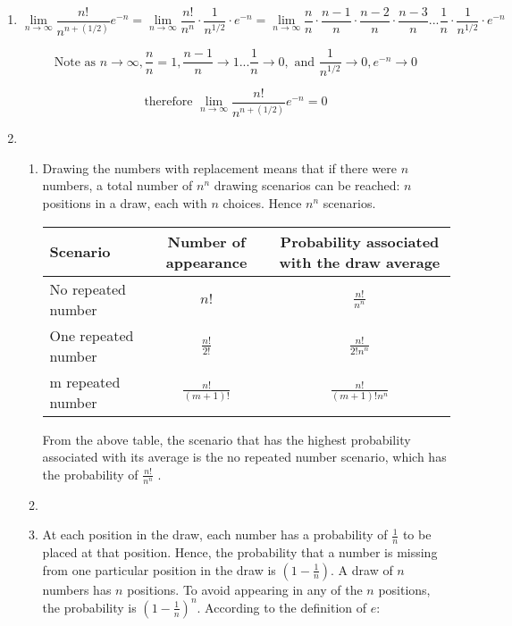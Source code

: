 \documentclass[11pt,letterpaper,titlepage]{article}
\begin{document}
\begin{enumerate}
    \item $$ \lim_{n\to\infty} \frac{n!}{n^{n+(1/2)}}e^{-n} = \lim_{n\to\infty} \frac{n!}{n^{n}} \cdot \frac{1}{n^{1/2}} \cdot e^{-n} = \lim_{n\to\infty} \frac{n}{n} \cdot \frac{n-1}{n} \cdot \frac{n-2}{n} \cdot \frac{n-3}{n} ... \frac{1}{n} \cdot \frac{1}{n^{1/2}} \cdot e^{-n} $$

    $$ \text{Note as } {n\to\infty}, \frac{n}{n} = 1, \frac{n-1}{n}\to 1...\frac{1}{n}\to 0, \text{ and } \frac{1}{n^{1/2}} \to 0, e^{-n} \to 0 $$
    
    $$ \text{therefore } \lim_{n\to\infty} \frac{n!}{n^{n+(1/2)}}e^{-n} = 0 $$
    
    \item \begin{enumerate}
        \item Drawing the numbers with replacement means that if there were $ n $ numbers, a total number of $ n^n $ drawing scenarios can be reached: $ n $ positions in a draw, each with $ n $ choices. Hence $ n^n $ scenarios.
        
        \begin{table}[ht]
        \centering
        \begin{tabular}{@{}lcc@{}}
        \toprule
        Scenario & Number of appearance & Probability associated with the draw average \\ \midrule
        No repeated number         &    $ n! $                   &   $ \frac{n!}{n^n} $                                           \\ \midrule
        One repeated number         &      $ \frac{n!}{2!} $                 &              $ \frac{n!}{2!n^n} $                                \\ \midrule
        m repeated number         &     $ \frac{n!}{(m+1)!} $                 &           $ \frac{n!}{(m+1)!n^n} $                                       \\ \bottomrule
        \end{tabular}
        \end{table}
        
        From the above table, the scenario that has the highest probability associated with its average is the no repeated number scenario, which has the probability of $ \frac{n!}{n^n} $ .
        
        \item
        
        \item At each position in the draw, each number has a probability of $ 
        \frac{1}{n} $ to be placed at that position. Hence, the probability that a number is missing from one particular position in the draw is $ (1-\frac{1}{n}) $. A draw of $ n $ numbers has $ n $ positions. To avoid appearing in any of the $ n $ positions, the probability is $ (1-\frac{1}{n})^n $. According to the definition of $ e $:
        

\end{enumerate}
\end{enumerate}
\end{document}
